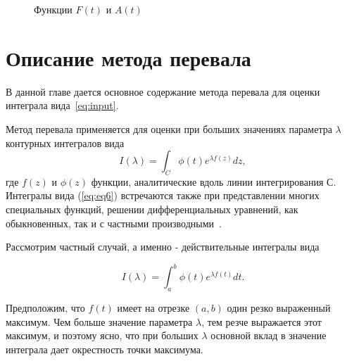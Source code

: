 \documentclass[14pt, a4paper]{article}
\numberwithin{figure}{section}
\numberwithin{equation}{section}
\newcommand{\sectionbreak}{\clearpage}
\begin{document}
\begin{figure}[h]
	\caption{Функции $F(t)$ и $A(t)$}
	\label{ris:f_a}
\end{figure}

\sectionbreak

\section{Описание метода перевала} 

В данной главе дается основное содержание метода перевала для оценки интеграла вида~\ref{eq:input}.
 
Метод перевала применяется для оценки при больших значениях параметра $\lambda$ контурных интегралов вида
\begin{equation}\label{eq:eq6}
I(\lambda) = \int_{C}^{}\phi(t)e^{\lambda f(z)}dz,
\end{equation} 
где $f(z)$ и $\phi(z)$ функции, аналитические вдоль линии интегрирования $С$. Интегралы вида (\ref{eq:eq6}) встречаются также при представлении многих специальных функций, решении дифференциальных уравнений, как обыкновенных, так и с частными производными~\cite{Urmat}.

Рассмотрим частный случай, а именно - действительные интегралы вида

\begin{equation}\label{eq:eq7}
I(\lambda) = \int_{a}^{b}\phi(t)e^{\lambda f(t)}dt.
\end{equation} 

Предположим, что $f(t)$ имеет на отрезке $(a, b)$ один резко выраженный максимум. Чем больше значение параметра $\lambda$, тем резче выражается этот максимум, и поэтому ясно, что при больших $\lambda$ основной вклад в значение интеграла дает окрестность точки максимума. 
\end{document}
